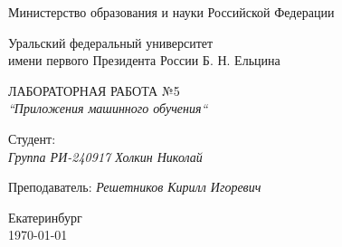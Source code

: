 \thispagestyle{empty}

\begin{center}
	Министерство образования и науки Российской Федерации
	
	\vspace{20pt}
	
	Уральский федеральный университет \\
	имени первого Президента России Б. Н. Ельцина
	
	\vspace{20pt}

\end{center}

\vfill

\begin{center}
	ЛАБОРАТОРНАЯ РАБОТА №5 \\
	\textit{``Приложения машинного обучения``}
	
	\vspace{20pt}
\end{center}

\vfill

	\noindent Студент: \\
	\textit{Группа РИ-240917 \hfill Холкин Николай}
	
	\vspace{5pt}
	
	\noindent Преподаватель: 
	\textit{\hfill Решетников Кирилл Игоревич}
	
	\vspace{20pt}

\vfill

\begin{center}
	Екатеринбург \\ \today
\end{center}

\newpage